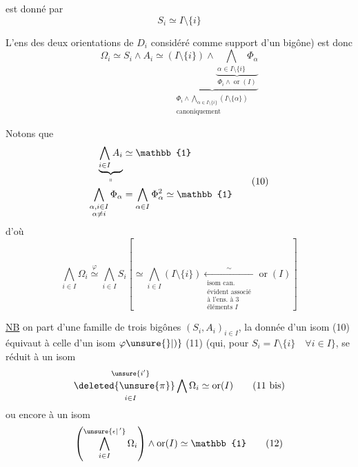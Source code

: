 est donné par
\[
 S_i\simeq I\setminus\{i\}\tag*{(8)}
\]

L'ens des deux orientations de $D_i$ considéré comme support d'un bigône) est donc
\[
 \Omega_i\simeq S_i\wedge A_i\simeq
 \underbrace{(I\setminus\{i\})\wedge
 \underbrace{\bigwedge_{\alpha\in I\setminus\{i\}}\Phi_\alpha}_{\Phi_i\wedge\operatorname{or}(I)}}
 _{\substack{\Phi_i\wedge\bigwedge_{\alpha\in I\setminus\{i\}}(I\setminus\{\alpha\})\\\text{canoniquement}}}\tag*{(9)}
\]

Notons que
\[
\begin{aligned}
 \underbrace{\bigwedge_{i\in I} A_i}_{\shortparallel}&\simeq\mathbb{1}\\
 \bigwedge_{\substack{\alpha,i\in I\\\alpha\ne i}}\Phi_\alpha
 &=\bigwedge_{\alpha\in I}\Phi_\alpha^2\simeq\mathbb{1}
\end{aligned}\tag*{(10)}
\]
d'où
\[
 \bigwedge_{i\in I}\Omega_i\overset{\varphi}{\simeq}
 \bigwedge_{i\in I}S_i
 \left[\simeq\bigwedge_{i\in I}(I\setminus\{i\})
 \underset{\substack{\text{isom can.}\\\text{évident associé}\\\text{à l'ens. à 3}\\\text{éléments }I}}{\overset{\sim}{\leftarrow}}
 \operatorname{or}(I)\right]\tag*{(11)}
\]

\uline{NB}  on part d'une famille  de trois bigônes $(S_i,A_i)_{i\in I}$, la donnée d'un isom (10) équivaut à celle d'un isom $\varphi\unsure{\}|)}$ (11) (qui, pour $S_i=I\setminus\{i\}\quad\forall i\in I\}$, se réduit à un isom
\[
 \mathop{\deleted{\unsure{\pi}}\bigwedge}\limits_{i\in I}^{\unsure{i'}}\Omega_i\simeq\operatorname{or}(I)\tag*{(11 bis)}
\]
ou encore à un isom
\[
 \left(\bigwedge_{i\in I}^{\unsure{\epsilon|{\,}'}}\Omega_i\right)\wedge\operatorname{or}(I)\simeq\mathbb{1}\tag*{(12)}
\]
